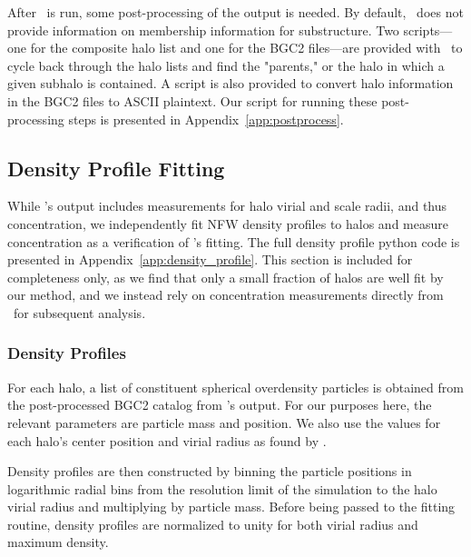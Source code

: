 After \rockstar\ is run, some post-processing of the output is needed.  By default, \rockstar\ does not provide information on membership information for substructure.  Two scripts---one for the composite halo list and one for the BGC2 files---are provided with \rockstar\ to cycle back through the halo lists and find the "parents," or the halo in which a given subhalo is contained.  A script is also provided to convert halo information in the BGC2 files to ASCII plaintext.  Our script for running these post-processing steps is presented in Appendix~\ref{app:postprocess}.




\subsection{Density Profile Fitting}
\label{subsec:analysis--profile_fitting}


While \rockstar's output includes measurements for halo virial and scale radii, and thus concentration, we independently fit NFW density profiles to halos and measure concentration as a verification of \rockstar's fitting.  The full density profile python code is presented in Appendix~\ref{app:density_profile}.  This section is included for completeness only, as we find that only a small fraction of halos are well fit by our method, and we instead rely on concentration measurements directly from \rockstar\ for subsequent analysis.



\subsubsection{Density Profiles}
\label{subsubsec:analysis--profile_fitting--density_profiles}


For each halo, a list of constituent spherical overdensity particles is obtained from the post-processed BGC2 catalog from \rockstar's output.  For our purposes here, the relevant parameters are particle mass and position.  We also use the values for each halo's center position and virial radius as found by \rockstar.

Density profiles are then constructed by binning the particle positions in logarithmic radial bins from the resolution limit of the simulation to the halo virial radius and multiplying by particle mass.  Before being passed to the fitting routine, density profiles are normalized to unity for both virial radius and maximum density. 



